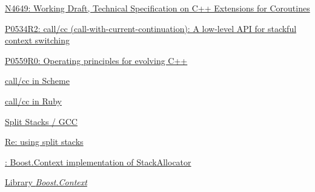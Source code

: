 \newpage
{}
\begin{thebibliography}{99}

        \href{http://www.open-std.org/jtc1/sc22/wg21/docs/papers/2017/n4649.pdf}
        {N4649: Working Draft, Technical Specification on C++ Extensions for Coroutines}

        \href{http://www.open-std.org/jtc1/sc22/wg21/docs/papers/2017/p0534r2.pdf}
        {P0534R2: call/cc (call-with-current-continuation): A low-level API for stackful
        context switching}

        \href{http://www.open-std.org/jtc1/sc22/wg21/docs/papers/2017/p0559r0.pdf}
        {P0559R0: Operating principles for evolving C++}

        \href{http://community.schemewiki.org/?call-with-current-continuation}
        {call/cc in Scheme}

        \href{http://gnuu.org/2009/03/21/demystifying-continuations-in-ruby}
        {call/cc in Ruby}

        \href{http://gcc.gnu.org/wiki/SplitStacks}
        {Split Stacks / GCC}

        \href{https://gcc.gnu.org/ml/gcc-help/2012-03/msg00395.html}
        {Re: using split stacks}

        \href{https://github.com/boostorg/context/blob/master/include/boost/context/posix/segmented_stack.hpp}
        {: Boost.Context implementation
        of  StackAllocator}

        \href{http://www.boost.org/doc/libs/release/libs/context/doc/html/index.html}
        {Library \emph{Boost.Context}}

\end{thebibliography}
